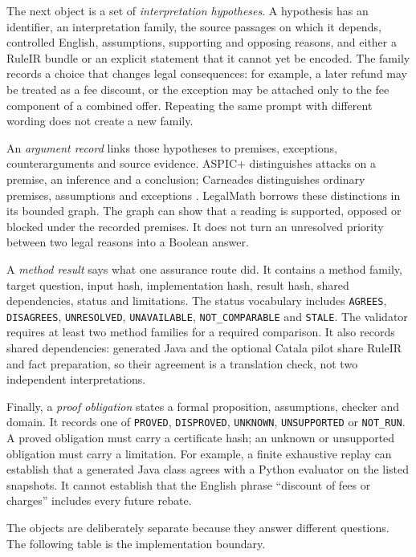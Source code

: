 \documentclass[12pt,a4paper,oneside,openany]{book}
\begin{document}
The next object is a set of \emph{interpretation hypotheses}. A hypothesis has
an identifier, an interpretation family, the source passages on which it
depends, controlled English, assumptions, supporting and opposing reasons, and
either a RuleIR bundle or an explicit statement that it cannot yet be encoded.
The family records a choice that changes legal consequences: for example, a
later refund may be treated as a fee discount, or the exception may be attached
only to the fee component of a combined offer. Repeating the same prompt with
different wording does not create a new family.

An \emph{argument record} links those hypotheses to premises, exceptions,
counterarguments and source evidence. ASPIC+ distinguishes attacks on a
premise, an inference and a conclusion; Carneades distinguishes ordinary
premises, assumptions and exceptions \citep[secs.~2--3]{aspic2010}
\citep[secs.~3--6]{carneades2007}. LegalMath borrows these distinctions in its
bounded graph. The graph can show that a reading is supported, opposed or
blocked under the recorded premises. It does not turn an unresolved priority
between two legal reasons into a Boolean answer.

A \emph{method result} says what one assurance route did. It contains a method
family, target question, input hash, implementation hash, result hash, shared
dependencies, status and limitations. The status vocabulary includes
\texttt{AGREES}, \texttt{DISAGREES}, \texttt{UNRESOLVED},
\texttt{UNAVAILABLE}, \texttt{NOT\_COMPARABLE} and \texttt{STALE}. The
validator requires at least two method families for a required comparison. It
also records shared dependencies: generated Java and the optional Catala pilot
share RuleIR and fact preparation, so their agreement is a translation check,
not two independent interpretations.

Finally, a \emph{proof obligation} states a formal proposition, assumptions,
checker and domain. It records one of \texttt{PROVED}, \texttt{DISPROVED},
\texttt{UNKNOWN}, \texttt{UNSUPPORTED} or \texttt{NOT\_RUN}. A proved
obligation must carry a certificate hash; an unknown or unsupported obligation
must carry a limitation. For example, a finite exhaustive replay can establish
that a generated Java class agrees with a Python evaluator on the listed
snapshots. It cannot establish that the English phrase ``discount of fees or
charges'' includes every future rebate.

The objects are deliberately separate because they answer different questions.
The following table is the implementation boundary.
\end{document}
